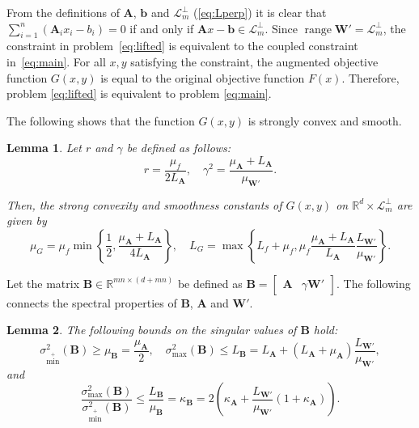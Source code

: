 \documentclass{article}
\newtheorem{lemma}{Lemma}
\DeclareMathOperator{\range}{\mathrm{range}}
\newcommand{\smax}{\sigma_{\max}}
\newcommand{\sminp}{\sigma_{\min^+}}
\newcommand{\R}{\mathbb{R}}
\def\<#1,#2>{\langle #1,#2\rangle}
\newcommand{\sX}{\R^d}
\newcommand{\sY}{\R^m}
\newcommand{\cL}{\mathcal{L}}
\newcommand{\mA}{\mathbf{A}}
\newcommand{\mB}{\mathbf{B}}
\newcommand{\pW}{\mathbf{W'}}
\newcommand{\mb}{\mathbf{b}}
\newcommand{\cbraces}[1]{\left( #1 \right)}
\newcommand{\braces}[1]{\left\{ #1 \right\}}
\begin{document}
From the definitions of $\mA$, $\mb$ and $\cL_m^\bot$ (\cref{eq:Lperp}) it is clear that $\sum_{i=1}^n (\mA_i x_i - b_i) = 0$ if and only if $\mA x - \mb \in \cL_{m}^\perp$. 
Since $\range \pW = \cL^\perp_m$, the constraint in problem~\eqref{eq:lifted} is equivalent to the coupled constraint in~\eqref{eq:main}.
For all $x, y$ satisfying the constraint, the augmented objective function $G(x, y)$ is equal to the original objective function $F(x)$. 
Therefore, problem \eqref{eq:lifted} is equivalent to problem \eqref{eq:main}.


The following  shows that the function $G(x,y)$ is strongly convex and smooth.

\begin{lemma}\label{lem:G}
	Let $r$ and $\gamma$ be defined as follows:
	\begin{equation}\label{eq:r_gamma}
		r = \frac{\mu_f}{2L_{\mA}}, \quad \gamma^2 = \frac{\mu_\mA + L_\mA}{\mu_\pW}.
	\end{equation}

  Then, the strong convexity and smoothness constants of $G(x, y)$ on $\sX \times \cL_m^\perp $ are given by 
	\begin{equation}\label{eq:G_mu_L}
    \mu_G = \mu_f \min\braces{\frac12, \frac{\mu_\mA + L_\mA}{4 L_\mA}}, \quad L_G = \max\braces{L_f + \mu_f,  \mu_f\frac{\mu_\mA + L_\mA}{L_\mA}\frac{L_\pW}{\mu_\pW}}.
	\end{equation}
\end{lemma}


Let the matrix $\mB \in \R^{mn \times (d+mn)}$ be defined as $\mB = \left[\begin{matrix} \mA & \gamma \pW \end{matrix}\right]$.
The following  connects the spectral properties of $\mB$, $\mA$ and $\pW$.
\begin{lemma}\label{lem:B}
	The following bounds on the singular values of $\mB$ hold:
  \begin{equation}\label{eq:B_mu_L}
     \sminp^2(\mB) \geq \mu_\mB = \frac{\mu_\mA}{2} , \quad  \smax^2(\mB) \leq L_\mB = L_\mA + (L_\mA + \mu_\mA)\frac{L_\pW}{\mu_\pW},
  \end{equation}
  and
  \begin{equation}\label{eq:kappa_B}
    \frac{\smax^2(\mB)}{\sminp^2(\mB)} \leq \frac{L_\mB}{\mu_\mB} = \kappa_\mB = 2\cbraces{\kappa_\mA + \frac{L_\pW}{\mu_\pW}(1+\kappa_\mA)}.
  \end{equation}
\end{lemma}
\end{document}
